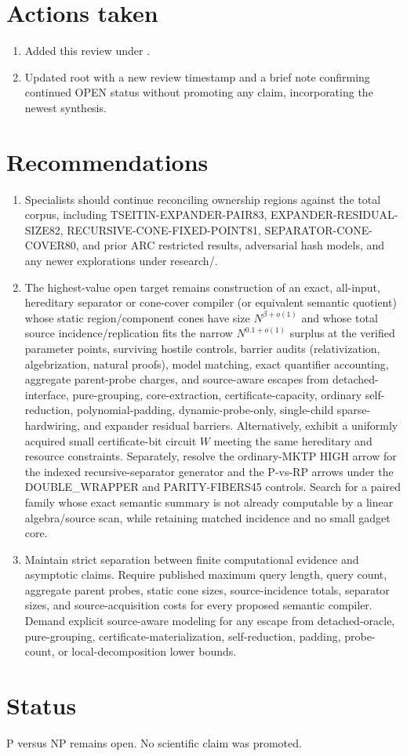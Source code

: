 \documentclass[11pt]{article}
\begin{document}
\section{Actions taken}
\begin{enumerate}
\item Added this review under .
\item Updated root  with a new review timestamp and a brief note confirming continued OPEN status without promoting any claim, incorporating the newest synthesis.
\end{enumerate}

\section{Recommendations}
\begin{enumerate}
\item Specialists should continue reconciling ownership regions against the total corpus, including TSEITIN-EXPANDER-PAIR83, EXPANDER-RESIDUAL-SIZE82, RECURSIVE-CONE-FIXED-POINT81, SEPARATOR-CONE-COVER80, and prior ARC restricted results, adversarial hash models, and any newer explorations under research/.
\item The highest-value open target remains construction of an exact, all-input, hereditary separator or cone-cover compiler (or equivalent semantic quotient) whose static region/component cones have size $N^{\beta+o(1)}$ and whose total source incidence/replication fits the narrow $N^{0.1+o(1)}$ surplus at the verified parameter points, surviving hostile controls, barrier audits (relativization, algebrization, natural proofs), model matching, exact quantifier accounting, aggregate parent-probe charges, and source-aware escapes from detached-interface, pure-grouping, core-extraction, certificate-capacity, ordinary self-reduction, polynomial-padding, dynamic-probe-only, single-child sparse-hardwiring, and expander residual barriers. Alternatively, exhibit a uniformly acquired small certificate-bit circuit $W$ meeting the same hereditary and resource constraints. Separately, resolve the ordinary-MKTP HIGH arrow for the indexed recursive-separator generator and the P-vs-RP arrows under the DOUBLE_WRAPPER and PARITY-FIBERS45 controls. Search for a paired family whose exact semantic summary is not already computable by a linear algebra/source scan, while retaining matched incidence and no small gadget core.
\item Maintain strict separation between finite computational evidence and asymptotic claims. Require published maximum query length, query count, aggregate parent probes, static cone sizes, source-incidence totals, separator sizes, and source-acquisition costs for every proposed semantic compiler. Demand explicit source-aware modeling for any escape from detached-oracle, pure-grouping, certificate-materialization, self-reduction, padding, probe-count, or local-decomposition lower bounds.
\end{enumerate}

\section{Status}
P versus NP remains open. No scientific claim was promoted.

\end{document}
